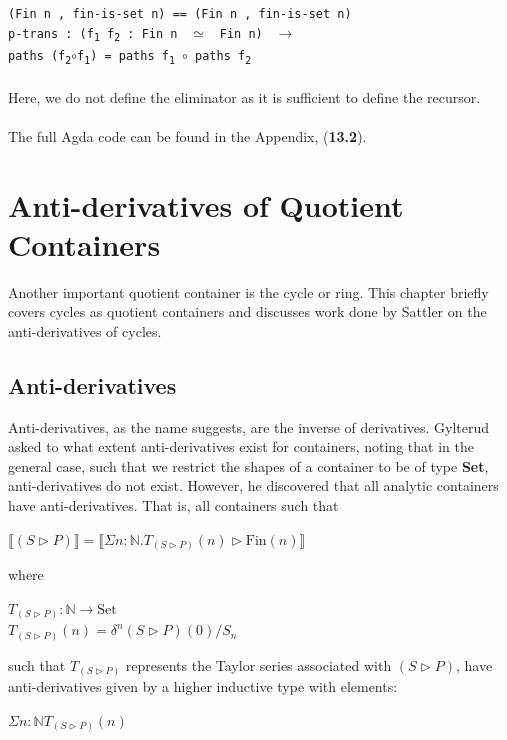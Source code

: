 \documentclass[12pt]{report}
\begin{document}
\-\hspace{4.2cm}\texttt{(Fin n , fin-is-set n) == (Fin n , fin-is-set n)}\\
\-\hspace{3.2cm}\texttt{p-trans : (f\textsubscript{1} f\textsubscript{2} : Fin n } $\simeq$ \texttt{ Fin n) } $\to$\\
\-\hspace{4.2cm} \texttt{paths (f\textsubscript{2}}$\circ$\texttt{f\textsubscript{1}) = paths f\textsubscript{1} }$\circ$\texttt{ paths f\textsubscript{2}}\\
\\
Here, we do not define the eliminator as it is sufficient to define the recursor.\\
\\
The full Agda code can be found in the Appendix, (\textbf{13.2}).

\chapter{Anti-derivatives of Quotient Containers}
Another important quotient container is the cycle or ring. This chapter briefly covers cycles as quotient containers and discusses work done by Sattler on the anti-derivatives of cycles.
\section{Anti-derivatives}
Anti-derivatives, as the name suggests, are the inverse of derivatives. Gylterud asked to what extent anti-derivatives exist for containers\cite{hott3}, noting that in the general case, such that we restrict the shapes of a container to be of type \textbf{Set}, anti-derivatives do not exist. However, he discovered that all analytic containers have anti-derivatives. That is, all containers such that
\begin{center}
$\llbracket (S \rhd P) \rrbracket = \llbracket \Sigma n : \mathbb{N}. T_{(S \rhd P)}(n) \rhd \text{Fin}(n) \rrbracket$
\end{center}
\noindent where
\begin{center}
$T_{(S \rhd P)} : \mathbb{N} \to \text{Set} $\\
$T_{(S \rhd P)}(n) = \delta^{n}(S \rhd P)(0) / S_n$
\end{center}
\noindent such that $T_{(S \rhd P)}$ represents the Taylor series associated with $(S \rhd P)$, have anti-derivatives given by a higher inductive type with elements:
\begin{center}
$\Sigma n : \mathbb{N} T_{(S \rhd P)} (n) $
\end{center} 
\end{document}
